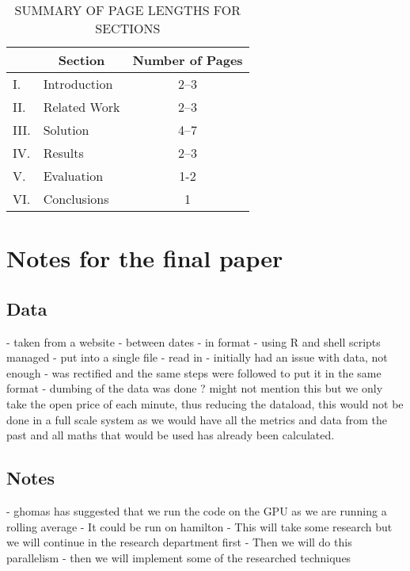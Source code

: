 \documentclass[12pt,a4paper]{article}
\begin{document}
\iffalse
#################################################################################
\fi

\begin{table}[htb]
\centering
\caption{SUMMARY OF PAGE LENGTHS FOR SECTIONS}
\vspace*{6pt}
\label{summary}
\begin{tabular}{|ll|c|} \hline
& \multicolumn{1}{c|}{\bf Section} & {\bf Number of Pages} \\ \hline
I. & Introduction & 2--3 \\ \hline
II. & Related Work & 2--3 \\ \hline
III. & Solution & 4--7 \\ \hline
IV. & Results & 2--3 \\ \hline
V. & Evaluation & 1-2 \\ \hline
VI. & Conclusions & 1 \\ \hline
\end{tabular}
\end{table}

\iffalse
#################################################################################
\fi

\section*{Notes for the final paper}

\subsection*{Data}
- taken from a website
- between dates
- in format
- using R and shell scripts managed
- put into a single file
- read in
- initially had an issue with data, not enough
- was rectified and the same steps were followed to put it in the same format
- dumbing of the data was done ? might not mention this but we only take the open price of each minute, thus reducing the dataload, this would not be done in a full scale system as we would have all the metrics and data from the past and all maths that would be used has already been calculated.

\subsection*{Notes}
- ghomas has suggested that we run the code on the GPU as we are running a rolling average
- It could be run on hamilton
- This will take some research but we will continue in the research department first
- Then we will do this parallelism
- then we will implement some of the researched techniques
\end{document}
